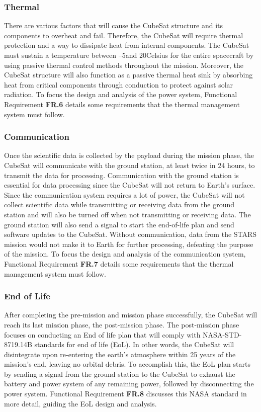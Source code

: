 \subsubsection{Thermal}
There are various factors that will cause the CubeSat structure and its components to overheat and fail. Therefore, the CubeSat will require thermal protection and a way to dissipate heat from internal components. The CubeSat must sustain a temperature between –5\degree  and 20\degree  Celsius for the entire spacecraft by using passive thermal control methods throughout the mission. Moreover, the CubeSat structure will also function as a passive thermal heat sink by absorbing heat from critical components through conduction to protect against solar radiation.  To focus the design and analysis of the power system, Functional Requirement \textbf{FR.6} details some requirements that the thermal management system must follow. 
\subsubsection{Communication}
Once the scientific data is collected by the payload during the mission phase, the CubeSat will communicate with the ground station, at least twice in 24 hours, to transmit the data for processing. Communication with the ground station is essential for data processing since the CubeSat will not return to Earth’s surface. Since the communication system requires a lot of power, the CubeSat will not collect scientific data while transmitting or receiving data from the ground station and will also be turned off when not transmitting or receiving data. The ground station will also send a signal to start the end-of-life plan and send software updates to the CubeSat.  Without communication, data from the STARS mission would not make it to Earth for further processing, defeating the purpose of the mission. To focus the design and analysis of the communication system, Functional Requirement \textbf{FR.7} details some requirements that the thermal management system must follow. 
\subsubsection{End of Life}
After completing the pre-mission and mission phase successfully, the CubeSat will reach its last mission phase, the post-mission phase. The post-mission phase focuses on conducting an End of life plan that will comply with NASA-STD-8719.14B\cite{STD8719} standards for end of life (EoL). In other words, the CubeSat will disintegrate upon re-entering the earth's atmosphere within 25 years of the mission's end, leaving no orbital debris. To accomplish this, the EoL plan starts by sending a signal from the ground station to the CubeSat to exhaust the battery and power system of any remaining power, followed by disconnecting the power system. Functional Requirement \textbf{FR.8} discusses this NASA standard in more detail, guiding the EoL design and analysis. 
